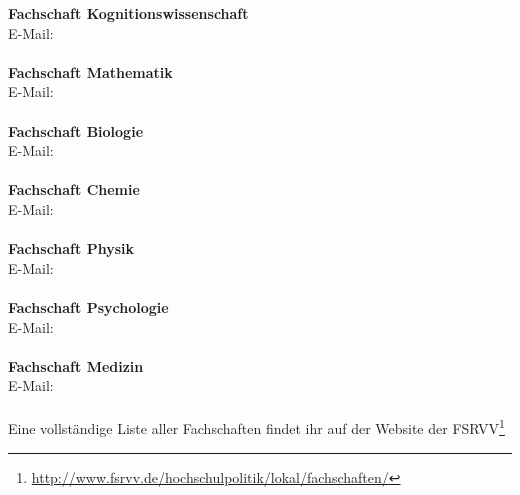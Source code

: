 \textbf{Fachschaft Kognitionswissenschaft}\\
E-Mail: \\
\\
\textbf{Fachschaft Mathematik}\\
E-Mail: \\
\\
\textbf{Fachschaft Biologie}\\
E-Mail: \\
\\
\textbf{Fachschaft Chemie}\\
E-Mail: \\
\\
\textbf{Fachschaft Physik}\\
E-Mail: \\
\\
\textbf{Fachschaft Psychologie}\\
E-Mail: \\
\\
\textbf{Fachschaft Medizin}\\
E-Mail: \\
\\
Eine vollständige Liste aller Fachschaften findet ihr auf der Website der FSRVV\footnote{\url{http://www.fsrvv.de/hochschulpolitik/lokal/fachschaften/}}

\vfill
